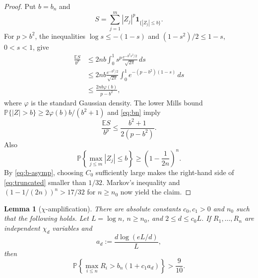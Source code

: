 \documentclass[11pt]{article}
\newtheorem{lemma}[theorem]{Lemma}
\newcommand{\Prob}{\mathbb P}
\begin{document}
\begin{proof}
Put $b=b_n$ and
\[
 S=\sum_{j=1}^m |Z_j|^p\mathbf 1_{\{|Z_j|\le b\}}.
\]
For $p>b^2$, the inequalities $\log s\le -(1-s)$ and
$(1-s^2)/2\le1-s$, $0<s<1$, give
\begin{align*}
 \frac{\mathbb ES}{b^p}
 &\le 2nb\int_0^1 s^p\frac{e^{-b^2s^2/2}}{\sqrt{2\pi}}\,ds\\
 &\le 2nb\frac{e^{-b^2/2}}{\sqrt{2\pi}}
       \int_0^1e^{-(p-b^2)(1-s)}\,ds\\
 &\le \frac{2nb\varphi(b)}{p-b^2},
\end{align*}
where $\varphi$ is the standard Gaussian density.  The lower Mills bound
$\Prob\{|Z|>b\}\ge 2\varphi(b)b/(b^2+1)$ and \eqref{eq:bn} imply
\begin{equation}\label{eq:truncated}
       \frac{\mathbb ES}{b^p}
       \le \frac{b^2+1}{2(p-b^2)}.
\end{equation}
Also
\[
 \Prob\left\{\max_{j\le m}|Z_j|\le b\right\}
 \ge\left(1-\frac1{2n}\right)^n.
\]
By \eqref{eq:b-asymp}, choosing $C_0$ sufficiently large makes the
right-hand side of \eqref{eq:truncated} smaller than $1/32$.  Markov's
inequality and
$(1-1/(2n))^n>17/32$ for $n\ge n_0$ now yield the claim.
\end{proof}

\begin{lemma}[$\chi$-amplification]\label{lem:chi}
There are absolute constants $c_0,c_1>0$ and $n_0$ such that the following
holds.  Let $L=\log n$, $n\ge n_0$, and
$2\le d\le c_0L$.  If $R_1,\ldots,R_n$ are independent $\chi_d$ variables
and
\[
       a_d:=\frac{d\log(eL/d)}{L},
\]
then
\[
 \Prob\left\{\max_{i\le n}R_i>b_n(1+c_1a_d)\right\}>\frac9{10}.
\]
\end{lemma}
\end{document}
